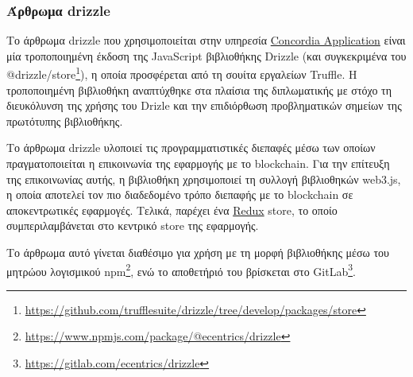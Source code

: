 \subsubsection{Άρθρωμα drizzle} \label{subsubsection:4-3-1-drizzle-unit}

Το άρθρωμα drizzle που χρησιμοποιείται στην υπηρεσία \hyperref[subsection:4-3-2-concordia-application-service]{Concordia Application} είναι μία τροποποιημένη έκδοση της JavaScript βιβλιοθήκης Drizzle (και συγκεκριμένα του @drizzle/store\footnote{\url{https://github.com/trufflesuite/drizzle/tree/develop/packages/store}}), η οποία προσφέρεται από τη σουίτα εργαλείων Truffle. Η τροποποιημένη βιβλιοθήκη αναπτύχθηκε στα πλαίσια της διπλωματικής με στόχο τη διευκόλυνση της χρήσης του Drizle και την επιδιόρθωση προβληματικών σημείων της πρωτότυπης βιβλιοθήκης.

Το άρθρωμα drizzle υλοποιεί τις προγραμματιστικές διεπαφές μέσω των οποίων πραγματοποιείται η επικοινωνία της εφαρμογής με το blockchain. Για την επίτευξη της επικοινωνίας αυτής, η βιβλιοθήκη χρησιμοποιεί τη συλλογή βιβλιοθηκών web3.js, η οποία αποτελεί τον πιο διαδεδομένο τρόπο διεπαφής με το blockchain σε αποκεντρωτικές εφαρμογές. Τελικά, παρέχει ένα \hyperref[subsection:4-2-2-2-redux]{Redux} store, το οποίο συμπεριλαμβάνεται στο κεντρικό store της εφαρμογής.

Το άρθρωμα αυτό γίνεται διαθέσιμο για χρήση με τη μορφή βιβλιοθήκης μέσω του μητρώου λογισμικού npm\footnote{\url{https://www.npmjs.com/package/@ecentrics/drizzle}}, ενώ το αποθετήριό του βρίσκεται στο GitLab\footnote{\url{https://gitlab.com/ecentrics/drizzle}}.